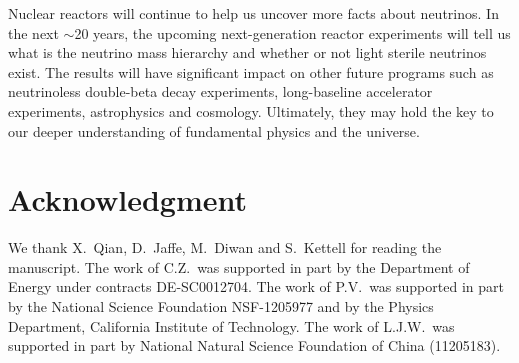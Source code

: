 \documentclass[aps,twocolumn,preprintnumbers,amsmath,superscriptaddress,amssymb,floats,nofootinbib]{revtex4-1}
\begin{document}
Nuclear reactors will continue to help us uncover more facts about neutrinos. In the next $\sim$20 years, the upcoming next-generation reactor experiments will tell us what is the neutrino mass hierarchy and whether or not light sterile neutrinos exist. The results will have significant impact on other future programs such as neutrinoless double-beta decay experiments, long-baseline accelerator experiments, astrophysics and cosmology. Ultimately, they may hold the key to our deeper understanding of fundamental physics and the universe.

\vspace{12pt}
\section*{Acknowledgment}
We thank X.~Qian, D.~Jaffe, M.~Diwan and S.~Kettell for reading the manuscript.
The work of C.Z.~was supported in part by the Department of Energy under contracts DE-SC0012704.
The work of P.V.~was supported in part by the National Science Foundation NSF-1205977 and by the Physics Department, California Institute of Technology.
The work of L.J.W.~was supported in part by National Natural Science Foundation of China (11205183).

% 
% 
\end{document}

